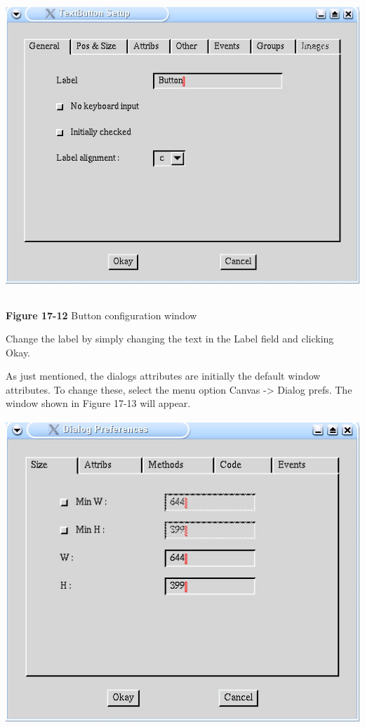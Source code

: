 \begin{center}
\includegraphics[width=5.698in,height=4.4783in]{ub-img/ub-img61.jpg}
\end{center}

{\sffamily\bfseries Figure 17-12}
{\sffamily Button configuration window}

Change the label by simply changing the text in the
{\textquotedbl}Label{\textquotedbl} field and clicking
{\textquotedbl}Okay{\textquotedbl}.

As just mentioned, the dialog{\textquotesingle}s attributes are
initially the default window attributes. To change these, select the
menu option Canvas -{\textgreater} Dialog prefs. The window shown in
Figure 17-13 will appear.

\begin{center}
\includegraphics[width=5.2799in,height=4.4807in]{ub-img/ub-img63.jpg}
\end{center}

